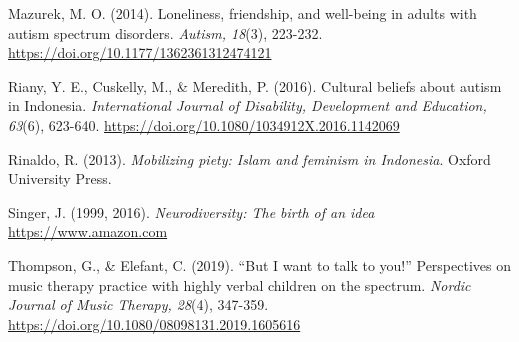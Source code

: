\documentclass[authordate, empirical, issue]{jote-new-article}
\begin{document}
Mazurek, M. O. (2014). Loneliness, friendship, and well-being in adults with autism spectrum disorders. \emph{Autism, 18}(3), 223-232. \href{https://doi.org/10.1177/1362361312474121}{https://doi.org/10.1177/1362361312474121}







Riany, Y. E., Cuskelly, M., \& Meredith, P. (2016). Cultural beliefs about autism in Indonesia. \emph{International Journal of Disability, Development and Education, 63}(6), 623-640. \href{https://doi.org/10.1080/1034912X.2016.1142069}{https://doi.org/10.1080/1034912X.2016.1142069}







Rinaldo, R. (2013). \emph{Mobilizing piety: Islam and feminism in Indonesia}. Oxford University Press.







Singer, J. (1999, 2016). \emph{Neurodiversity: The birth of an idea} \href{https://www.amazon.com}{https://www.amazon.com}







Thompson, G., \& Elefant, C. (2019). “But I want to talk to you!” Perspectives on music therapy practice with highly verbal children on the spectrum. \emph{Nordic Journal of Music Therapy, 28}(4), 347-359. \href{https://doi.org/10.1080/08098131.2019.1605616}{https://doi.org/10.1080/08098131.2019.1605616}
\end{document}
